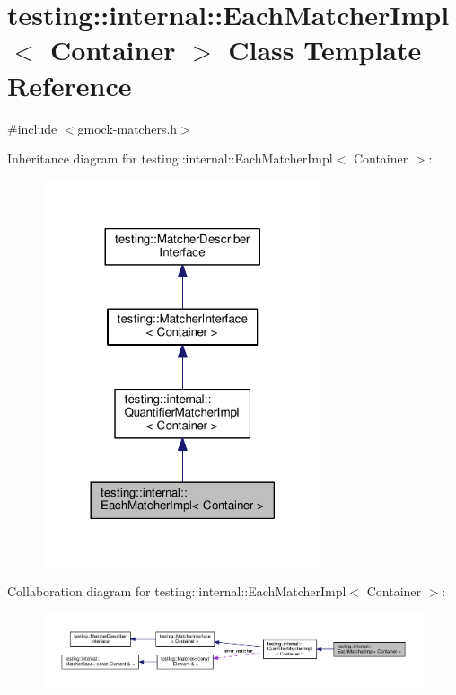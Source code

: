 \hypertarget{classtesting_1_1internal_1_1EachMatcherImpl}{}\section{testing\+:\+:internal\+:\+:Each\+Matcher\+Impl$<$ Container $>$ Class Template Reference}
\label{classtesting_1_1internal_1_1EachMatcherImpl}


{\ttfamily \#include $<$gmock-\/matchers.\+h$>$}



Inheritance diagram for testing\+:\+:internal\+:\+:Each\+Matcher\+Impl$<$ Container $>$\+:
\nopagebreak
\begin{figure}[H]
\begin{center}
\leavevmode
\includegraphics[width=233pt]{classtesting_1_1internal_1_1EachMatcherImpl__inherit__graph}
\end{center}
\end{figure}


Collaboration diagram for testing\+:\+:internal\+:\+:Each\+Matcher\+Impl$<$ Container $>$\+:
\nopagebreak
\begin{figure}[H]
\begin{center}
\leavevmode
\includegraphics[width=350pt]{classtesting_1_1internal_1_1EachMatcherImpl__coll__graph}
\end{center}
\end{figure}
